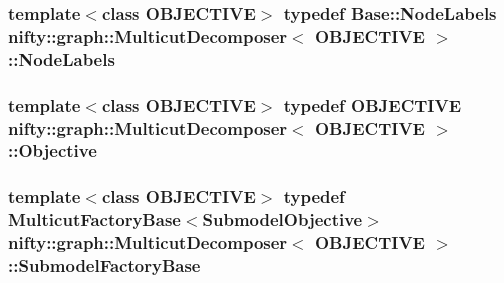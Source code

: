 \subsubsection[{Node\+Labels}]{\setlength{\rightskip}{0pt plus 5cm}template$<$class O\+B\+J\+E\+C\+T\+I\+V\+E$>$ typedef {\bf Base\+::\+Node\+Labels} {\bf nifty\+::graph\+::\+Multicut\+Decomposer}$<$ O\+B\+J\+E\+C\+T\+I\+V\+E $>$\+::{\bf Node\+Labels}}\label{classnifty_1_1graph_1_1MulticutDecomposer_ab3e763da6e04631dabe7655a6642adab}
\hypertarget{classnifty_1_1graph_1_1MulticutDecomposer_aa365662e75a14ba2d7277243281a0ec2}{}
\subsubsection[{Objective}]{\setlength{\rightskip}{0pt plus 5cm}template$<$class O\+B\+J\+E\+C\+T\+I\+V\+E$>$ typedef O\+B\+J\+E\+C\+T\+I\+V\+E {\bf nifty\+::graph\+::\+Multicut\+Decomposer}$<$ O\+B\+J\+E\+C\+T\+I\+V\+E $>$\+::{\bf Objective}}\label{classnifty_1_1graph_1_1MulticutDecomposer_aa365662e75a14ba2d7277243281a0ec2}
\hypertarget{classnifty_1_1graph_1_1MulticutDecomposer_a94775bf93c00b927a43cab26e6edbcae}{}
\subsubsection[{Submodel\+Factory\+Base}]{\setlength{\rightskip}{0pt plus 5cm}template$<$class O\+B\+J\+E\+C\+T\+I\+V\+E$>$ typedef {\bf Multicut\+Factory\+Base}$<${\bf Submodel\+Objective}$>$ {\bf nifty\+::graph\+::\+Multicut\+Decomposer}$<$ O\+B\+J\+E\+C\+T\+I\+V\+E $>$\+::{\bf Submodel\+Factory\+Base}}\label{classnifty_1_1graph_1_1MulticutDecomposer_a94775bf93c00b927a43cab26e6edbcae}
\hypertarget{classnifty_1_1graph_1_1MulticutDecomposer_a8b90ad3406b214b8033428adba308579}{}
